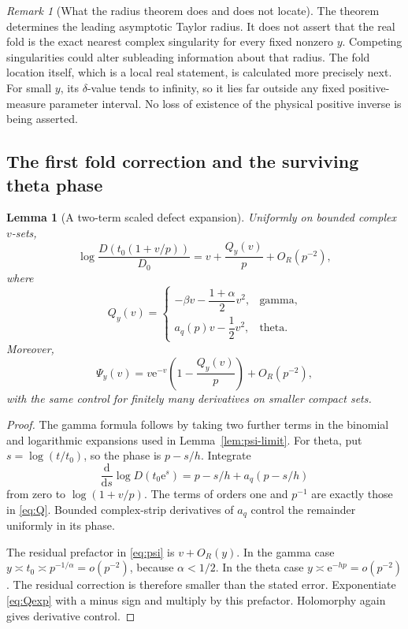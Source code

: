 \documentclass[11pt,a4paper]{article}
\numberwithin{equation}{section}
\newtheorem{lemma}[theorem]{Lemma}
\theoremstyle{definition}
\theoremstyle{remark}
\newtheorem{remark}[theorem]{Remark}
\newcommand{\ee}{\mathrm e}
\begin{document}
\begin{remark}[What the radius theorem does and does not locate]
The theorem determines the leading asymptotic Taylor radius. It does
not assert that the real fold is the exact nearest complex singularity
for every fixed nonzero \(y\). Competing singularities could alter
subleading information about that radius. The fold location itself,
which is a local real statement, is calculated more precisely next.
For small \(y\), its \(\delta\)-value tends to infinity, so it lies far
outside any fixed positive-measure parameter interval. No loss of
existence of the physical positive inverse is being asserted.
\end{remark}

\subsection{The first fold correction and the surviving theta phase}

\begin{lemma}[A two-term scaled defect expansion]
\label{lem:Q}
Uniformly on bounded complex \(v\)-sets,
\begin{equation}
 \log\frac{D(t_0(1+v/p))}{D_0}
 =v+\frac{Q_y(v)}p+O_R(p^{-2}),
 \label{eq:Qexp}
\end{equation}
where
\begin{equation}
 Q_y(v)=
 \begin{cases}
 -\beta v-\dfrac{1+\alpha}{2}v^2,&\text{gamma},\\[3pt]
 a_q(p)v-\dfrac12v^2,&\text{theta}.
 \end{cases}
 \label{eq:Q}
\end{equation}
Moreover,
\begin{equation}
 \Psi_y(v)=v\ee^{-v}\left(1-\frac{Q_y(v)}p\right)
                      +O_R(p^{-2}),
 \label{eq:psicorrection}
\end{equation}
with the same control for finitely many derivatives on smaller compact
sets.
\end{lemma}
\begin{proof}
The gamma formula follows by taking two further terms in the binomial
and logarithmic expansions used in Lemma~\ref{lem:psi-limit}.
For theta, put \(s=\log(t/t_0)\), so the phase is \(p-s/h\). Integrate
\[
 \frac{\mathrm d}{\mathrm ds}\log D(t_0\ee^s)
 =p-s/h+a_q(p-s/h)
\]
from zero to \(\log(1+v/p)\). The terms of orders one and \(p^{-1}\)
are exactly those in \eqref{eq:Q}. Bounded complex-strip derivatives of
\(a_q\) control the remainder uniformly in its phase.

The residual prefactor in \eqref{eq:psi} is \(v+O_R(y)\). In the gamma
case \(y\asymp t_0\asymp p^{-1/\alpha}=o(p^{-2})\), because
\(\alpha<1/2\). In the theta case \(y\asymp\ee^{-hp}=o(p^{-2})\).
The residual correction is therefore smaller than the stated error.
Exponentiate \eqref{eq:Qexp} with a minus sign and multiply by this
prefactor. Holomorphy again gives derivative control.
\end{proof}
\end{document}
